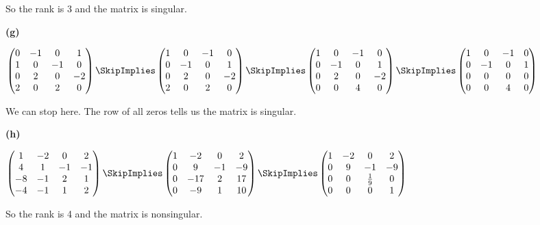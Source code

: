 \documentclass[oneside,12pt]{amsart}
\begin{document}
\bigskip

So the rank is 3 and the matrix is singular.


\bigskip

\textbf{(g)}

$
\begin{pmatrix}
0 & -1 & 0 & 1 \\
1 & 0 & -1 & 0 \\
0 & 2 & 0 & -2 \\
2 & 0 & 2 & 0
\end{pmatrix}
\SkipImplies
\begin{pmatrix}
1 & 0 & -1 & 0 \\
0 & -1 & 0 & 1 \\
0 & 2 & 0 & -2 \\
2 & 0 & 2 & 0
\end{pmatrix}
\SkipImplies
\begin{pmatrix}
1 & 0 & -1 & 0 \\
0 & -1 & 0 & 1 \\
0 & 2 & 0 & -2 \\
0 & 0 & 4 & 0
\end{pmatrix}
\SkipImplies
\begin{pmatrix}
1 & 0 & -1 & 0 \\
0 & -1 & 0 & 1 \\
0 & 0 & 0 & 0 \\
0 & 0 & 4 & 0
\end{pmatrix}
$

\bigskip

We can stop here. The row of all zeros tells us the matrix is singular.

\bigskip

\textbf{(h)}

$
\begin{pmatrix}
1 & -2 & 0 & 2 \\
4 & 1 & -1 & -1 \\
-8 & -1 & 2 & 1 \\
-4 & -1 & 1 & 2
\end{pmatrix}
\SkipImplies
\begin{pmatrix}
1 & -2 & 0 & 2 \\
0 & 9 & -1 & -9 \\
0 & -17 & 2 & 17 \\
0 & -9 & 1 & 10
\end{pmatrix}
\SkipImplies
\begin{pmatrix}
1 & -2 & 0 & 2 \\
0 & 9 & -1 & -9 \\
0 & 0 & \frac{1}{9} & 0 \\
0 & 0 & 0 & 1
\end{pmatrix}
$

\bigskip

So the rank is 4 and the matrix is nonsingular.
\end{document}
